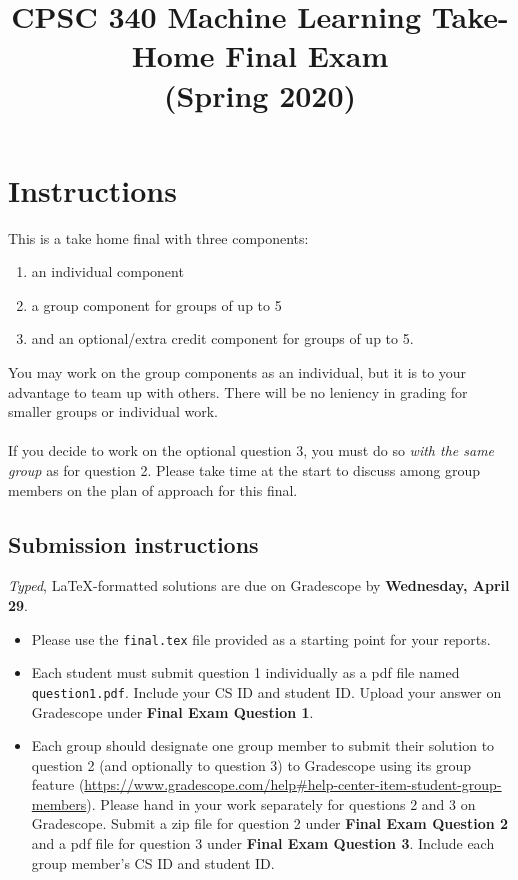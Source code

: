 \documentclass{article}
\def\items#1{\begin{itemize}#1\end{itemize}}
\def\enum#1{\begin{enumerate}#1\end{enumerate}}
\begin{document}
\title{CPSC 340 Machine Learning Take-Home Final Exam\\ (Spring 2020)}
\date{}
\maketitle
\vspace{-5em}

\section*{Instructions}
This is a take home final with three components:\enum{
	\item an individual component 
	\item a group component for groups of up to 5
	\item and an optional/extra credit component for groups of up to 5.}
You may work on the group components as an individual, but it is to your advantage to team up with others. There will be no leniency in grading for smaller groups or individual work. \\
\\
If you decide to work on the optional question 3, you must do so \textit{with the same group} as for question 2. Please take time at the start to discuss among group members on the plan of approach for this final.

\subsection*{Submission instructions}
\textit{Typed}, \LaTeX-formatted solutions are due on Gradescope by \textbf{Wednesday, April 29}.\items{
	\item Please use the \texttt{final.tex} file provided as a starting point for your reports.
	\item Each student must submit question 1 individually as a pdf file named \texttt{question1.pdf}. Include your CS ID and student ID. Upload your answer on Gradescope under \textbf{Final Exam Question 1}.
	\item Each group should designate one group member to submit their solution to question 2 (and optionally to question 3) to Gradescope using its group feature (\url{https://www.gradescope.com/help#help-center-item-student-group-members}). Please hand in your work separately for questions 2 and 3 on Gradescope. Submit a zip file for question 2 under \textbf{Final Exam Question 2} and a pdf file for question 3 under \textbf{Final Exam Question 3}. Include each group member's CS ID and student ID.}
\end{document}
